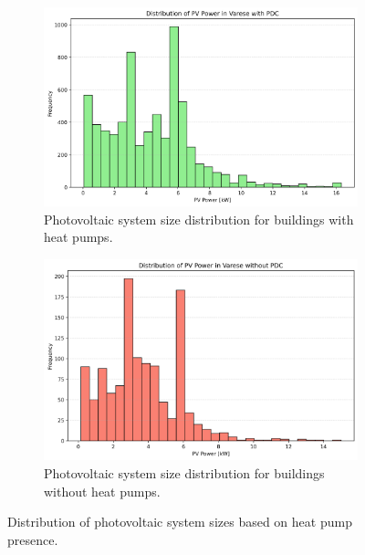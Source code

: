 \begin{figure}[H]
    \centering
    \begin{subfigure}[b]{0.45\textwidth}
        \centering
        \includegraphics[width=\textwidth]{figures/1_pv_size_hp.png}
        \caption{Photovoltaic system size distribution for buildings with heat pumps.}
        \label{fig:pv_size_hp}
    \end{subfigure}
    \hfill
    \begin{subfigure}[b]{0.45\textwidth}
        \centering
        \includegraphics[width=\textwidth]{figures/1_pv_size_no_hp.png}
        \caption{Photovoltaic system size distribution for buildings without heat pumps.}
        \label{fig:pv_size_no_hp}
    \end{subfigure}
    \caption{Distribution of photovoltaic system sizes based on heat pump presence.}
    \label{fig:pv_size_comparison}
\end{figure}

